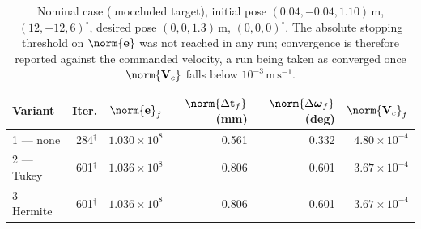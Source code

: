 %
%

\begin{table}[t]
    \centering
    \caption{Nominal case (unoccluded target), initial pose
    $(0.04,-0.04,1.10)\,\mathrm{m}$, $(12,-12,6)^{\circ}$, desired pose
    $(0,0,1.3)\,\mathrm{m}$, $(0,0,0)^{\circ}$. The absolute stopping
    threshold on $\norm{\mathbf{e}}$ was not reached in any run; convergence
    is therefore reported against the commanded velocity, a run being taken
    as converged once $\norm{\mathbf{V}_c}$ falls below
    $10^{-3}\,\mathrm{m\,s^{-1}}$.}
    \label{tab:ch4-nominal}
    \begin{tabular}{@{}lrrrrr@{}}
        \toprule
        Variant & Iter. & $\norm{\mathbf{e}}_f$
                & $\norm{\Delta\mathbf{t}_f}$ (mm)
                & $\norm{\Delta\boldsymbol{\omega}_f}$ (deg)
                & $\norm{\mathbf{V}_c}_f$ \\
        \midrule
        1 --- none    & 284$^{\dagger}$ & $1.030\times10^{8}$ & 0.561 & 0.332 & $4.80\times10^{-4}$ \\
        2 --- Tukey   & 601$^{\dagger}$ & $1.036\times10^{8}$ & 0.806 & 0.601 & $3.67\times10^{-4}$ \\
        3 --- Hermite & 601$^{\dagger}$ & $1.036\times10^{8}$ & 0.806 & 0.601 & $3.67\times10^{-4}$ \\
        \bottomrule
    \end{tabular}
\end{table}


